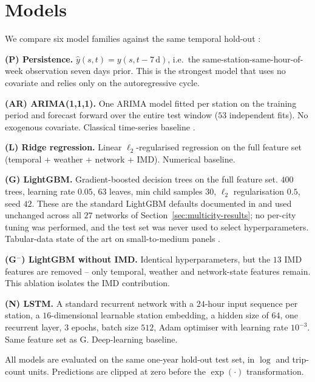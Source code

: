 \documentclass[11pt,a4paper]{article}
\begin{document}
\section{Models}
\label{sec:models}

We compare six model families against the same temporal
hold-out :

\textbf{(P) Persistence.}  $\hat{y}(s, t) = y(s, t - 7\,\text{d})$,
i.e.\ the same-station-same-hour-of-week observation seven days
prior.  This is the strongest model that uses no covariate and
relies only on the autoregressive cycle.

\textbf{(AR) ARIMA(1,1,1).}  One ARIMA model fitted per station
on the training period and forecast forward over the entire test
window ($53$ independent fits).  No exogenous covariate.  Classical
time-series baseline \citep{Box1976,Hyndman2008}.

\textbf{(L) Ridge regression.}  Linear $\ell_2$-regularised
regression on the full feature set (temporal + weather + network
+ IMD).  Numerical baseline.

\textbf{(G) LightGBM.}  Gradient-boosted decision trees
\citep{Ke2017} on the full feature set.  $400$ trees, learning
rate $0.05$, $63$ leaves, min child samples $30$, $\ell_2$
regularisation $0.5$, seed $42$.  These are the standard
LightGBM defaults documented in \citet{Ke2017} and used unchanged
across all $27$ networks of Section~\ref{sec:multicity-results};
no per-city tuning was performed, and the test set was never
used to select hyperparameters.  Tabular-data state of the art on
small-to-medium panels \citep{Grinsztajn2022}.

\textbf{(G$^-$) LightGBM without IMD.}  Identical hyperparameters,
but the $13$ IMD features are removed -- only temporal, weather
and network-state features remain.  This ablation isolates the
IMD contribution.

\textbf{(N) LSTM.}  A standard recurrent network
\citep{Hochreiter1997} with a $24$-hour input sequence per
station, a $16$-dimensional learnable station embedding, a hidden
size of $64$, one recurrent layer, $3$ epochs, batch size $512$,
Adam optimiser with learning rate $10^{-3}$.  Same feature set as
G.  Deep-learning baseline.

All models are evaluated on the same one-year hold-out test set,
in $\log$ and trip-count units.  Predictions are clipped at zero
before the $\exp(\cdot)$ transformation.
\end{document}
